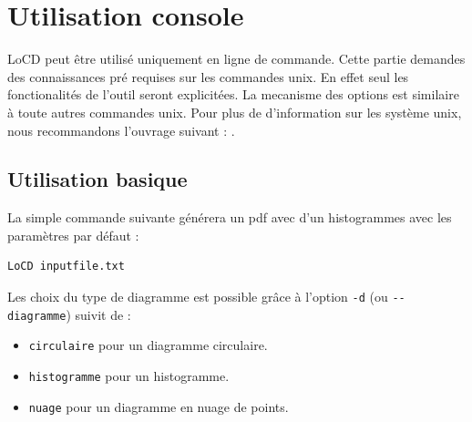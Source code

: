 \chapter{Utilisation console}

\renewcommand{\labelitemi}{$\bullet$} %

LoCD peut être utilisé uniquement en ligne de commande. Cette partie demandes des connaissances pré requises sur les commandes unix. En effet seul les fonctionalités de l'outil seront explicitées. La mecanisme des options est similaire à toute autres commandes unix. Pour plus de d'information sur les système unix, nous recommandons l'ouvrage suivant : \cite{linux}.


\section{Utilisation basique}
\label{sec:usebas}
La simple commande suivante générera un pdf avec d'un histogrammes avec les paramètres par défaut : %
\begin{verbatim}LoCD inputfile.txt\end{verbatim}Les choix du type de diagramme est possible grâce à l'option \verb+-d+ (ou \verb+--diagramme+) suivit de : 
\begin{itemize}
\item
\verb+circulaire+ pour un diagramme circulaire.
\item
\verb+histogramme+ pour un histogramme.
\item
\verb+nuage+ pour un diagramme en nuage de points.
\end{itemize}


